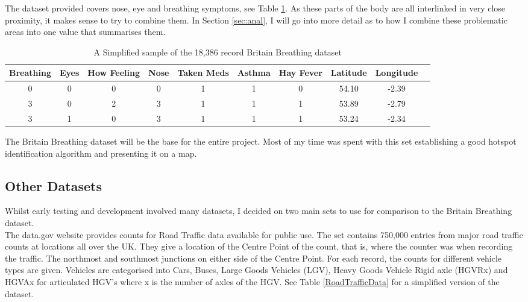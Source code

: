 The dataset provided covers nose, eye and breathing symptoms, see Table \ref{bbdatatable}. As these parts of the body are all interlinked in very close proximity, it makes sense to try to combine them. In Section \ref{sec:anal}, I will go into more detail as to how I combine these problematic areas into one value that summarises them.\\


\begin{table}[H]
\begin{center}
\begin{tabular}{|c|c|c|c|c|c|c|c|c|c}\hline\hline
Breathing&Eyes&How Feeling&Nose&Taken Meds&Asthma&Hay Fever&Latitude&Longitude\\\hline
0&0&0&0&1&1&0&54.10&-2.39\\
3&0&2&3&1&1&1&53.89&-2.79\\
3&1&0&3&1&1&1&53.24&-2.34\\\hline\hline
\end{tabular}
\end{center}
\caption{A Simplified sample of the 18,386 record Britain Breathing dataset}
\label{bbdatatable}
\end{table}

The Britain Breathing dataset will be the base for the entire project. Most of my time was spent with this set establishing a good hotspot identification algorithm and presenting it on a map.

\subsection{Other Datasets}

Whilst early testing and development involved many datasets, I decided on two main sets to use for comparison to the Britain Breathing dataset.\\

The data.gov website provides counts for Road Traffic data available for public use. The set contains 750,000 entries from major road traffic counts at locations all over the UK. They give a location of the Centre Point of the count, that is, where the counter was when recording the traffic. The northmost and southmost junctions on either side of the Centre Point. For each record, the counts for different vehicle types are given. Vehicles are categorised into Cars, Buses, Large Goods Vehicles (LGV), Heavy Goods Vehicle Rigid axle (HGVRx) and HGVAx for articulated HGV's where x is the number of axles of the HGV. See Table \ref{RoadTrafficData} for a simplified version of the dataset.\\


